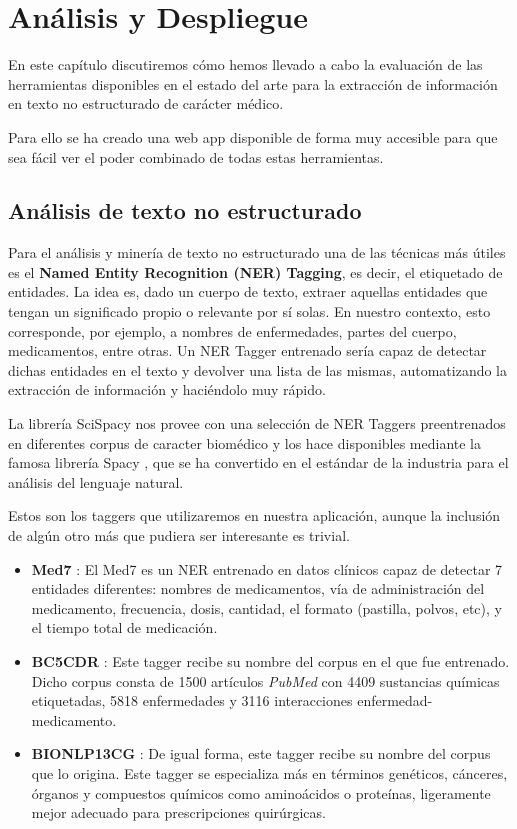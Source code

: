 \chapter{Análisis y Despliegue}

En este capítulo discutiremos cómo hemos llevado a cabo la evaluación de las herramientas disponibles en el estado del arte para la extracción de información en texto no estructurado de carácter médico.

Para ello se ha creado una web app disponible de forma muy accesible para que sea fácil ver el poder combinado de todas estas herramientas.

\section{Análisis de texto no estructurado}

Para el análisis y minería de texto no estructurado una de las técnicas más útiles es el \textbf{Named Entity Recognition (NER) Tagging}, es decir, el etiquetado de entidades. La idea es, dado un cuerpo de texto, extraer aquellas entidades que tengan un significado propio o relevante por sí solas. En nuestro contexto, esto corresponde, por ejemplo, a nombres de enfermedades, partes del cuerpo, medicamentos, entre otras. Un NER Tagger entrenado sería capaz de detectar dichas entidades en el texto y devolver una lista de las mismas, automatizando la extracción de información y haciéndolo muy rápido.

La librería SciSpacy \cite{neumann-etal-2019-scispacy} nos provee con una selección de NER Taggers preentrenados en diferentes corpus de caracter biomédico y los hace disponibles mediante la famosa librería Spacy \cite{spacy}, que se ha convertido en el estándar de la industria para el análisis del lenguaje natural.

Estos son los taggers que utilizaremos en nuestra aplicación, aunque la inclusión de algún otro más que pudiera ser interesante es trivial. 

\begin{itemize}
	\item \textbf{Med7} \cite{med7}: El Med7 es un NER entrenado en datos clínicos capaz de detectar 7 entidades diferentes: nombres de medicamentos, vía de administración del medicamento, frecuencia, dosis, cantidad, el formato (pastilla, polvos, etc), y el tiempo total de medicación. 
	\item \textbf{BC5CDR} \cite{bc5cdr}: Este tagger recibe su nombre del corpus en el que fue entrenado. Dicho corpus consta de 1500 artículos \textit{PubMed} con 4409 sustancias químicas etiquetadas, 5818 enfermedades y 3116 interacciones enfermedad-medicamento.
	\item \textbf{BIONLP13CG} \cite{BIONLP13CG}: De igual forma, este tagger recibe su nombre del corpus que lo origina. Este tagger se especializa más en términos genéticos, cánceres, órganos y compuestos químicos como aminoácidos o proteínas, ligeramente mejor adecuado para prescripciones quirúrgicas.
\end{itemize}

